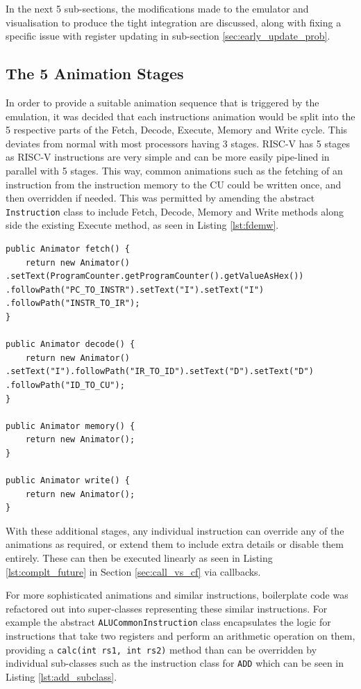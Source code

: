 In the next 5 sub-sections, the modifications made to the emulator and visualisation to produce the tight integration are discussed, along with fixing a specific issue with register updating in sub-section \ref{sec:early_update_prob}.

\subsection{The 5 Animation Stages}
In order to provide a suitable animation sequence that is triggered by the emulation, it was decided that each instructions animation would be split into the 5 respective parts of the Fetch, Decode, Execute, Memory and Write cycle. This deviates from normal with most processors having 3 stages. RISC-V has 5 stages as RISC-V instructions are very simple and can be more easily pipe-lined in parallel with 5 stages. This way, common animations such as the fetching of an instruction from the instruction memory to the \ac{CU} could be written once, and then overridden if needed. This was permitted by amending the abstract \texttt{Instruction} class to include Fetch, Decode, Memory and Write methods along side the existing Execute method, as seen in Listing \ref{lst:fdemw}.

\begin{lstlisting}[caption={Additional Fetch, Decode, Memeory and Write methods added to the abstract \texttt{Instruction } class}, label=lst:fdemw]
public Animator fetch() {
    return new Animator() .setText(ProgramCounter.getProgramCounter().getValueAsHex()) .followPath("PC_TO_INSTR").setText("I").setText("I") .followPath("INSTR_TO_IR");
}

public Animator decode() {
    return new Animator() .setText("I").followPath("IR_TO_ID").setText("D").setText("D") .followPath("ID_TO_CU");
}

public Animator memory() {
    return new Animator();
}

public Animator write() {
    return new Animator();
}
\end{lstlisting}

With these additional stages, any individual instruction can override any of the animations as required, or extend them to include extra details or disable them entirely. These can then be executed linearly as seen in Listing \ref{lst:complt_future} in Section \ref{sec:call_vs_cf} via callbacks.

For more sophisticated animations and similar instructions, boilerplate code was refactored out into super-classes representing these similar instructions. For example the abstract \texttt{ALUCommonInstruction} class encapsulates the logic for instructions that take two registers and perform an arithmetic operation on them, providing a \verb|calc(int rs1, int rs2)| method than can be overridden by individual sub-classes such as the instruction class for \texttt{ADD} which can be seen in Listing \ref{lst:add_subclass}.

